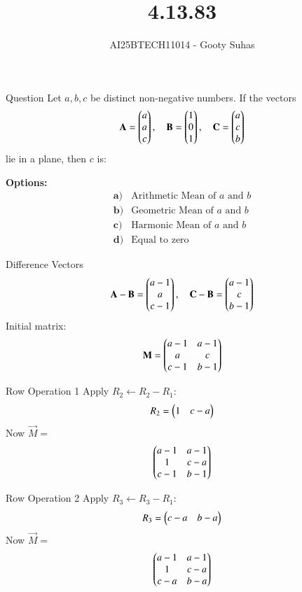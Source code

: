 \documentclass{beamer}
\title{4.13.83}
\author{AI25BTECH11014 - Gooty Suhas}
\begin{document}
\frame{\titlepage}

\begin{frame}{Question}
Let \( a, b, c \) be distinct non-negative numbers. If the vectors
\[
\mathbf{A} = \begin{pmatrix}a \\ a \\ c\end{pmatrix}, \quad
\mathbf{B} = \begin{pmatrix}1 \\ 0 \\ 1\end{pmatrix}, \quad
\mathbf{C} = \begin{pmatrix}a \\ c \\ b\end{pmatrix}
\]
lie in a plane, then \( c \) is:





\textbf{Options:}
\[
\begin{array}{ll}
\textbf{a)} & \text{Arithmetic Mean of } a \text{ and } b \\
\textbf{b)} & \text{Geometric Mean of } a \text{ and } b \\
\textbf{c)} & \text{Harmonic Mean of } a \text{ and } b \\
\textbf{d)} & \text{Equal to zero}
\end{array}
\]




\end{frame}

\begin{frame}{Difference Vectors}
\[
\mathbf{A} - \mathbf{B} = \begin{pmatrix}a - 1 \\ a \\ c - 1\end{pmatrix}, \quad
\mathbf{C} - \mathbf{B} = \begin{pmatrix}a - 1 \\ c \\ b - 1\end{pmatrix}
\]
Initial matrix:
\[
\mathbf{M} =
\begin{pmatrix}
a - 1 & a - 1 \\
a     & c     \\
c - 1 & b - 1
\end{pmatrix}
\]
\end{frame}

\begin{frame}{Row Operation 1}
Apply \( R_2 \leftarrow R_2 - R_1 \):
\[
R_2 = \begin{pmatrix}1 & c - a\end{pmatrix}
\]
Now \( \vec{M} = \)
\[
\begin{pmatrix}
a - 1 & a - 1 \\
1     & c - a \\
c - 1 & b - 1
\end{pmatrix}
\]
\end{frame}

\begin{frame}{Row Operation 2}
Apply \( R_3 \leftarrow R_3 - R_1 \):
\[
R_3 = \begin{pmatrix}c - a & b - a\end{pmatrix}
\]
Now \( \vec{M} = \)
\[
\begin{pmatrix}
a - 1 & a - 1 \\
1     & c - a \\
c - a & b - a
\end{pmatrix}
\]
\end{frame}
\end{document}
